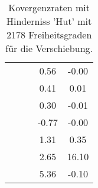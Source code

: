 \begin{table}
\begin{tabular}{c|cc|cc|}
\multicolumn{1}{|c|}{} & \multicolumn{1}{|c|}{} & \multicolumn{1}{|c|}{} & \multicolumn{1}{|c|}{      0.56} & \multicolumn{1}{|c|}{     -0.00} \\ 
\multicolumn{1}{|c|}{} & \multicolumn{1}{|c|}{} & \multicolumn{1}{|c|}{} & \multicolumn{1}{|c|}{      0.41} & \multicolumn{1}{|c|}{      0.01} \\ 
\multicolumn{1}{|c|}{} & \multicolumn{1}{|c|}{} & \multicolumn{1}{|c|}{} & \multicolumn{1}{|c|}{      0.30} & \multicolumn{1}{|c|}{     -0.01} \\ 
\multicolumn{1}{|c|}{} & \multicolumn{1}{|c|}{} & \multicolumn{1}{|c|}{} & \multicolumn{1}{|c|}{     -0.77} & \multicolumn{1}{|c|}{     -0.00} \\ 
\multicolumn{1}{|c|}{} & \multicolumn{1}{|c|}{} & \multicolumn{1}{|c|}{} & \multicolumn{1}{|c|}{      1.31} & \multicolumn{1}{|c|}{      0.35} \\ 
\multicolumn{1}{|c|}{} & \multicolumn{1}{|c|}{} & \multicolumn{1}{|c|}{} & \multicolumn{1}{|c|}{      2.65} & \multicolumn{1}{|c|}{     16.10} \\ 
\multicolumn{1}{|c|}{} & \multicolumn{1}{|c|}{} & \multicolumn{1}{|c|}{} & \multicolumn{1}{|c|}{      5.36} & \multicolumn{1}{|c|}{     -0.10} \\ 
\hline 
\end{tabular}\caption{Kovergenzraten mit Hinderniss 'Hut' mit 2178 Freiheitsgraden für die Verschiebung.}\label{tab:Rate_Hut_level4}
\end{table} 
